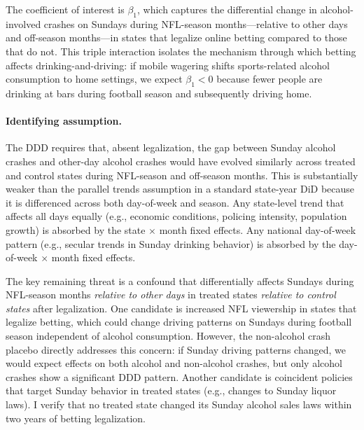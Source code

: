 \documentclass[12pt]{article}
\begin{document}
The coefficient of interest is $\beta_1$, which captures the differential change in alcohol-involved crashes on Sundays during NFL-season months---relative to other days and off-season months---in states that legalize online betting compared to those that do not. This triple interaction isolates the mechanism through which betting affects drinking-and-driving: if mobile wagering shifts sports-related alcohol consumption to home settings, we expect $\beta_1 < 0$ because fewer people are drinking at bars during football season and subsequently driving home.

\paragraph{Identifying assumption.} The DDD requires that, absent legalization, the gap between Sunday alcohol crashes and other-day alcohol crashes would have evolved similarly across treated and control states during NFL-season and off-season months. This is substantially weaker than the parallel trends assumption in a standard state-year DiD because it is differenced across both day-of-week and season. Any state-level trend that affects all days equally (e.g., economic conditions, policing intensity, population growth) is absorbed by the state $\times$ month fixed effects. Any national day-of-week pattern (e.g., secular trends in Sunday drinking behavior) is absorbed by the day-of-week $\times$ month fixed effects.

The key remaining threat is a confound that differentially affects Sundays during NFL-season months \emph{relative to other days} in treated states \emph{relative to control states} after legalization. One candidate is increased NFL viewership in states that legalize betting, which could change driving patterns on Sundays during football season independent of alcohol consumption. However, the non-alcohol crash placebo directly addresses this concern: if Sunday driving patterns changed, we would expect effects on both alcohol and non-alcohol crashes, but only alcohol crashes show a significant DDD pattern. Another candidate is coincident policies that target Sunday behavior in treated states (e.g., changes to Sunday liquor laws). I verify that no treated state changed its Sunday alcohol sales laws within two years of betting legalization.
\end{document}
